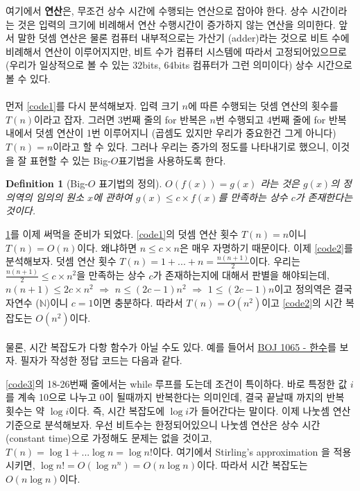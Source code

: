 \documentclass{article}
\newtheorem{definition}{Definition}
\begin{document}
        여기에서 \textbf{연산}은, 무조건 상수 시간에 수행되는 연산으로 잡아야 한다.
        상수 시간이라는 것은 입력의 크기에 비례해서 연산 수행시간이 증가하지 않는 연산을 의미한다.
        앞서 말한 덧셈 연산은 물론 컴퓨터 내부적으로는 가산기 (adder)라는 것으로 비트 수에 비례해서 연산이 이루어지지만, 비트 수가 컴퓨터 시스템에 따라서 고정되어있으므로 (우리가 일상적으로 볼 수 있는 $32$bits, $64$bits 컴퓨터가 그런 의미이다) 상수 시간으로 볼 수 있다. \\ \\
        먼저 \ref{code1}를 다시 분석해보자. 입력 크기 $n$에 따른 수행되는 덧셈 연산의 횟수를 $T(n)$이라고 잡자. 그러면 3번째 줄의 for 반복은 $n$번 수행되고 4번째 줄에 for 반복 내에서 덧셈 연산이 1번 이루어지니 (곱셈도 있지만 우리가 중요한건 그게 아니다) $T(n) = n$이라고 할 수 있다.
        그러나 우리는 증가의 정도를 나타내기로 했으니, 이것을 잘 표현할 수 있는 Big-$O$표기법을 사용하도록 한다.
        \begin{definition}[Big-$O$ 표기법의 정의]
            \label{def1}
            $O(f(x)) = g(x)$ 라는 것은 $g(x)$의 정의역의 임의의 원소 $x$에 관하여 $g(x) \leq c \times f(x)$를 만족하는 상수 $c$가 존재한다는 것이다.
        \end{definition}
        \ref{def1}를 이제 써먹을 준비가 되었다. \ref{code1}의 덧셈 연산 횟수 $T(n) = n$이니 $T(n) = O(n)$이다. 왜냐하면 $n \leq c \times n$은 매우 자명하기 때문이다.
        이제 \ref{code2}를 분석해보자. 덧셈 연산 횟수 $T(n) = 1 + ... + n = \frac{n(n+1)}{2}$이다. 우리는 $\frac{n(n+1)}{2} \leq c \times n^{2}$을 만족하는 상수 $c$가 존재하는지에 대해서 판별을 해야되는데, $n(n+1) \leq 2c \times n^{2}$ $\Rightarrow$ $n \leq (2c - 1)n^{2}$ $\Rightarrow$ $1 \leq (2c - 1)n$이고 정의역은 결국 자연수 ($\mathbb{N}$)이니 $c = 1$이면 충분하다.
        따라서 $T(n) = O(n^{2})$이고 \ref{code2}의 시간 복잡도는 $O(n^{2})$이다. \\ \\

        물론, 시간 복잡도가 다항 함수가 아닐 수도 있다. 예를 들어서 \href{https://www.acmicpc.net/problem/1065}{BOJ 1065 - 한수}를 보자. 필자가 작성한 정답 코드는 다음과 같다.
        
        \ref{code3}의 18-26번째 줄에서는 while 루프를 도는데 조건이 특이하다. 바로 특정한 값 $i$를 계속 10으로 나누고 0이 될때까지 반복한다는 의미인데, 결국 끝날때 까지의 반복 횟수는 약 $\log{i}$이다. 즉, 시간 복잡도에 $\log{i}$가 들어간다는 말이다.
        이제 나눗셈 연산 기준으로 분석해보자. 우선 비트수는 한정되어있으니 나눗셈 연산은 상수 시간 (constant time)으로 가정해도 문제는 없을 것이고, $T(n) = \log{1} + ... \log{n} = \log{n!}$이다. 여기에서 Stirling's approximation \cite{stirling}을 적용시키면, $\log{n!} = O(\log{n^{n}}) = O(n\log{n})$이다. 따라서 시간 복잡도는 $O(n\log{n})$이다.
    
    
\end{document}
